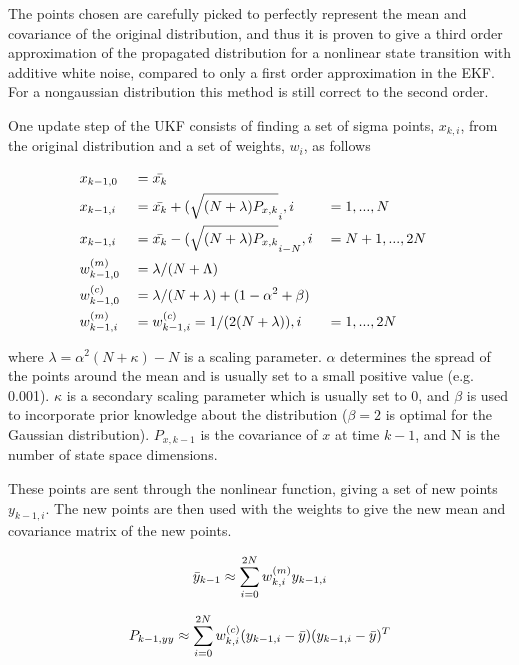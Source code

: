 The points chosen are carefully picked to perfectly represent the mean and covariance of the original distribution, and thus it is proven to give a third order approximation of the propagated distribution for a nonlinear state transition with additive white noise, compared to only a first order approximation in the EKF. For a nongaussian distribution this method is still correct to the second order.

One update step of the UKF consists of finding a set of sigma points, $x_{k,i}$, from the original distribution and a set of weights, $w_i$, as follows

\begin{alignat*}{3}
    & x_{k-1,0} &&= \Bar{x_k} \\
    & x_{k-1,i} &&= \Bar{x_k} + (\sqrt{(N+\lambda)P_{x,k}}_i, i &&= 1,...,N \\
    & x_{k-1,i} &&= \Bar{x_k} - (\sqrt{(N+\lambda)P_{x,k}}_{i-N}, i &&=N + 1,...,2N \\
    & w_{k-1,0}^{(m)} &&= \lambda/(N+\Lambda) \\ 
    & w_{k-1,0}^{(c)} &&= \lambda/(N+\lambda) + (1-\alpha^2 + \beta) \\
    & w_{k-1,i}^{(m)} &&= w_{k-1,i}^{(c)} = 1/(2(N+\lambda)), i &&= 1,...,2N
\end{alignat*}

where $\lambda = \alpha^2(N+\kappa) - N$ is a scaling parameter. $\alpha$ determines the spread of the points around the mean and is usually set to a small positive value (e.g. 0.001). $\kappa$ is a secondary scaling parameter which is usually set to 0, and $\beta$ is used to incorporate prior knowledge about the distribution ($\beta=2$ is optimal for the Gaussian distribution). $P_{x,k-1}$ is the covariance of $x$ at time $k-1$, and N is the number of state space dimensions. 

These points are sent through the nonlinear function, giving a set of new points $y_{k-1,i}$. The new points are then used with the weights to give the new mean and covariance matrix of the new points. 


\begin{equation}
    \Bar{y}_{k-1} \approx \sum_{i=0}^{2N} w_{k,i}^{(m)}y_{k-1,i}
\end{equation}

\begin{equation}
    P_{k-1, yy} \approx \sum_{i=0}^{2N} w_{k,i}^{(c)}(y_{k-1,i} - \Bar{y})(y_{k-1,i} - \Bar{y})^T
\end{equation}

